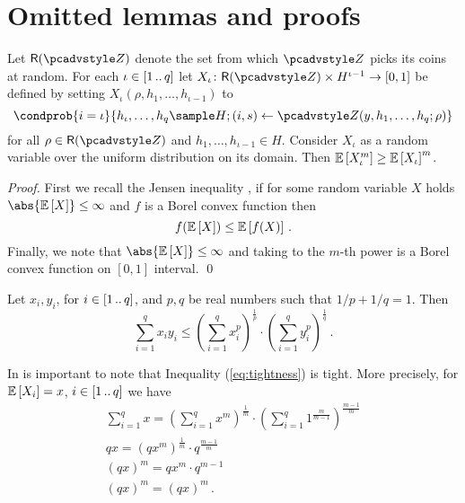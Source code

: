 \documentclass[runningheads,11pt]{llncs}
\begin{document}
\section{Omitted lemmas and proofs}
\begin{lemma}\label{lem:jensen}
	Let $\RND{\zdv}$ denote the set from which $\zdv$ picks its coins at random.
	For each $\iota \in [1 \, .. \, q]$ let $X_\iota \colon \RND{\zdv} \times
	H^{\iota - 1} \to [0, 1]$ be defined by setting $X_\iota(\rho, h_1, \ldots,
h_{\iota - 1})$ to 
\[
  \condprob{i = \iota}{h_\iota, \ldots, h_q \sample H; (i, s) \gets \zdv(y, h_1,
    \ldots, h_q; \rho)}
	\] 
	for all $\rho \in \RND{\zdv}$ and $h_1, \ldots, h_{\iota - 1} \in H$. Consider
  $X_\iota$ as a random variable over the uniform distribution on its domain.
  Then $\mathbb{E}\left[X_\iota^m\right] \geq \mathbb{E}\left[X_\iota\right]^m$.
\end{lemma}
\begin{proof}
	First we recall the Jensen inequality \cite{W:Weissten20}, if for some random
  variable $X$ holds $\abs{\expected{X}} \leq \infty$ and $f$ is a Borel convex
  function then
	\[
		f(\mathbb{E}\left[X\right]) \leq \mathbb{E}\left[f(X)\right]\,.
	\] 
	Finally, we note that $\abs{\expected{X}} \leq \infty$ and taking to the
  $m$-th power is a Borel convex function on $[0, 1]$ interval. \qed
\end{proof}

\begin{lemma}\label{lem:holder}
	Let $x_i, y_i$, for $i \in [1 \, .. \, q]$, and $p, q$ be real numbers such that
  $1/p + 1/q = 1$. Then
	\[
		\sum_{i = 1}^{q} x_i y_i \leq \left(\sum_{i = 1}^{q}
      x_i^p\right)^{\frac{1}{p}} \cdot \left(\sum_{i = 1}^{q}
      y_i^p\right)^{\frac{1}{q}}\,.
	\]
\end{lemma}

\begin{remark}
	In is important to note that Inequality (\ref{eq:tightness}) is tight. More
  precisely, for $\mathbb{E}\left[X_i\right] = x$, $i \in [1 \, .. \, q]$ we have
	\begin{gather*}
		\sum_{i = 1}^q x = \left(\sum_{i = 1}^{q} x^m\right)^\frac{1}{m} \cdot \left(\sum_{i = 1}^{q} 1^{\frac{m}{m - 1}}\right)^{\frac{m - 1}{m}} \\
		qx = \left(qx^m\right)^\frac{1}{m} \cdot q^{\frac{m - 1}{m}} \\
		(qx)^m = qx^m \cdot q^{m - 1} \\
		(qx)^m = (qx)^m\,.
	\end{gather*}
\end{remark}
\end{document}
